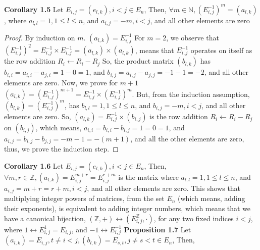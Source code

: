 \documentclass[12pt]{article}
\begin{document}
\newpage
\textbf{Corollary 1.5} \newline
Let $E_{i,j}=(e_{l,k}),i<j \in E_n$, Then,\newline
$\forall m \in \mathbb{N},(E_{i,j}^{-1})^m=(a_{l,k})$, where $a_{l,l}=1,1 \leq l \leq n$, and $a_{i,j}=-m,i<j$, and all other elements are zero
\begin{proof}
By induction on $m$. \newline
$(a_{l,k})=E_{i,j}^{-1}$
For $m=2$, we observe that $(E_{i,j}^{-1})^2=E_{i,j}^{-1} \times E_{i,j}^{-1}=(a_{l,k}) \times (a_{l,k})$, means that $E_{i,j}^{-1}$ operates on itself as the row addition $R_i \leftarrow R_i-R_j$ \newline
So, the product matrix $(b_{l,k})$ has $b_{i,i}=a_{i,i}-a_{j,i}=1-0=1$, and $b_{i,j}=a_{i,j}-a_{j,j}=-1-1=-2$, and all other elements are zero. \newline
Now, we prove for $m+1$ \newline
$(a_{l,k})=(E_{i,j}^{-1})^{m+1}=E_{i,j}^{-1} \times (E_{i,j}^{-1})^m$. But, from the induction assumption, $(b_{l,k})=(E_{i,j}^{-1})^m$, has $b_{l,l}=1,1 \leq l \leq n$, and $b_{i,j}=-m,i<j$, and all other elements are zero. \newline
So, $(a_{l,k})=E_{i,j}^{-1} \times (b_{i,j})$ is the row addition $R_i \leftarrow R_i-R_j$ on $(b_{i,j})$, which means, $a_{i,i}=b_{i,i}-b_{i,j}=1=0=1$, and $a_{i,j}=b_{i,j}-b_{j,j}=-m-1=-(m+1)$, and all the other elements are zero, thus, we prove the induction step. \newline
\end{proof}
\textbf{Corollary 1.6} 
Let $E_{i,j}=(e_{l,k}),i<j \in E_n$, Then,\newline
$\forall m,r \in \mathbb{Z},
(a_{l,k})=E_{i,j}^{m+r}=E_{i,j}^{r+m}$ is the matrix where $a_{l,l}=1,1 \leq l \leq n$, and $a_{i,j}=m+r=r+m,i<j$, and all other elements are zero. \newline
This shows that multiplying integer powers of matrices, from the set $E_n$ (which means, adding their exponents), is equivalent to adding integer numbers, which means that we have a canonical bijection, $(\mathbb{Z},+) \leftrightarrow (E_{i,j}^{\mathbb{Z}},\cdot)$, for any two fixed indices $i<j$, where $1 \leftrightarrow E_{i,j}^1=E_{i,j}$, and $-1 \leftrightarrow E_{i,j}^{-1}$ \newline 
\newpage
\textbf{Proposition 1.7} \newline
Let $(a_{l,k})=E_{i,j},t \neq i<j,(b_{l,k})=E_{s,t},j \neq s<t \in E_n$, Then, \newline
\end{document}
